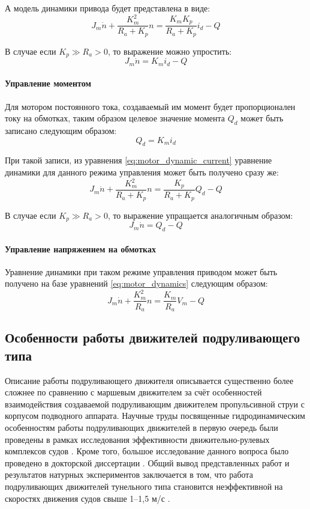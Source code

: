 А модель динамики привода будет представлена в виде:
\begin{equation}
    \label{eq:motor_dynamic_current}
    J_m\dot{n} + \frac{K_m^2}{R_a+K_p}n = \frac{K_m K_p}{R_a + K_p}i_d - Q
\end{equation}

В случае если $K_p \gg R_a > 0$, то выражение можно упростить:
\begin{equation}
    J_m\dot{n} = K_m i_d - Q  
\end{equation}

\paragraph{Управление моментом}
Для мотором постоянного тока, создаваемый им момент будет пропорционален току на обмотках, таким образом целевое значение момента $Q_d$ может быть записано следующим образом:
\begin{equation}
    Q_d = K_m i_d
\end{equation}

При такой записи, из уравнения \ref{eq:motor_dynamic_current} уравнение динамики для данного режима управления может быть получено сразу же:
\begin{equation}
    J_m\dot{n} + \frac{K_m^2}{R_a+K_p}n = \frac{K_p}{R_a + K_p}Q_d - Q
\end{equation}

В случае если $K_p \gg R_a > 0$, то выражение упращается аналогичным образом:
\begin{equation}
    J_m\dot{n} = Q_d - Q  
\end{equation}

\paragraph{Управление напряжением на обмотках}
Уравнение динамики при таком режиме управления приводом может быть получено на базе уравнений \ref{eq:motor_dynamics} следующим образом:
\begin{equation}
    J_m\dot{n} + \frac{K_m^2}{R_a}n = \frac{K_m}{R_a}V_m - Q
\end{equation}

\subsection{Особенности работы движителей подруливающего типа}
Описание работы подруливающего движителя описывается существенно более сложнее по сравнению с маршевым движителем за счёт особенностей взаимодействия создаваемой подруливающим движителем пропульсивной струи с корпусом подводного аппарата.
Научные труды посвященные гидродинамическим особенностям работы подруливающих движителей в первую очередь были проведены в рамках исследования эффективности движительно-рулевых комплексов судов \cite{chislett1966influence, english1964design, brix1973lateral}.
Кроме того, большое исследование данного вопроса было проведено в докторской диссертации \cite{nienhuis1992analysis}.
Общий вывод представленных работ и результатов натурных экспериментов заключается в том, что работа подруливающих движителей тунельного типа становится неэффективной на скоростях движения судов свыше 1–1,5 м/с \cite{english63}.

